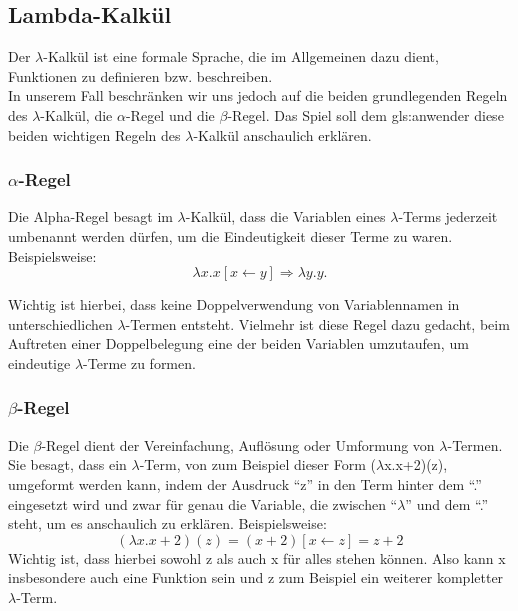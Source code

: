 \documentclass{scrartcl}
\begin{document}
\subsection{Lambda-Kalkül}  \label{subsection:LambdaKalkül}
\label{LambdaKalkül:AlgemeineErklärung}
\begin{minipage}{1\textwidth}
 Der $\lambda$-Kalkül ist eine formale Sprache, die im Allgemeinen dazu dient, Funktionen zu definieren bzw. beschreiben.\\
In unserem Fall beschränken wir uns jedoch auf die beiden grundlegenden Regeln des $\lambda$-Kalkül, die $\alpha$-Regel und die $\beta$-Regel. Das Spiel soll dem \gls{gls:anwender} diese beiden wichtigen Regeln des $\lambda$-Kalkül anschaulich erklären.

\subsubsection{\texorpdfstring{$\alpha$}{Alpha}-Regel}

Die Alpha-Regel besagt im $\lambda$-Kalkül, dass die Variablen eines $\lambda$-Terms jederzeit umbenannt werden dürfen, um die Eindeutigkeit dieser Terme zu waren. Beispielsweise:
\[
	\lambda x.x [x \leftarrow y] \Rightarrow \lambda y.y.
\]

Wichtig ist hierbei, dass keine Doppelverwendung von Variablennamen in unterschiedlichen $\lambda$-Termen entsteht. Vielmehr ist diese Regel dazu gedacht, beim Auftreten einer Doppelbelegung eine der beiden Variablen umzutaufen, um eindeutige $\lambda$-Terme zu formen.

\subsubsection{\texorpdfstring{$\beta$}{Beta}-Regel}

Die $\beta$-Regel dient der Vereinfachung, Auflösung oder Umformung von $\lambda$-Termen.\\
Sie besagt, dass ein $\lambda$-Term, von zum Beispiel dieser Form ($\lambda$x.x+2)(z), umgeformt werden kann, indem der Ausdruck ``z'' in den Term hinter dem ``.'' eingesetzt wird und zwar für genau die Variable, die zwischen ``$\lambda$'' und dem ``.'' steht, um es anschaulich zu erklären. Beispielsweise:
\[
	(\lambda x.x+2)(z) = (x+2)[x \leftarrow z] = z + 2
\]
Wichtig ist, dass hierbei sowohl z als auch x für alles stehen können. Also kann x insbesondere auch eine Funktion sein und z zum Beispiel ein weiterer kompletter $\lambda$-Term.


\end{minipage}
\end{document}
